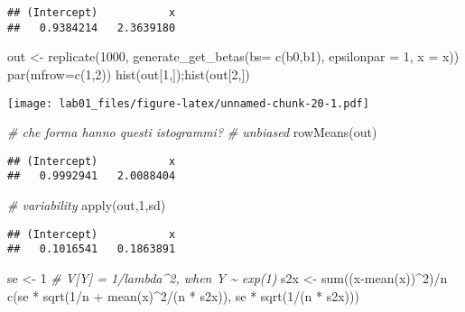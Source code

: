 \documentclass[
]{article}
\newenvironment{Shaded}{\begin{snugshade}}{\end{snugshade}}
\newcommand{\AttributeTok}[1]{\textcolor[rgb]{0.77,0.63,0.00}{#1}}
\newcommand{\CommentTok}[1]{\textcolor[rgb]{0.56,0.35,0.01}{\textit{#1}}}
\newcommand{\DecValTok}[1]{\textcolor[rgb]{0.00,0.00,0.81}{#1}}
\newcommand{\FunctionTok}[1]{\textcolor[rgb]{0.00,0.00,0.00}{#1}}
\newcommand{\NormalTok}[1]{#1}
\newcommand{\OtherTok}[1]{\textcolor[rgb]{0.56,0.35,0.01}{#1}}
\newcommand{\SpecialCharTok}[1]{\textcolor[rgb]{0.00,0.00,0.00}{#1}}
\begin{document}
\begin{verbatim}
## (Intercept)           x 
##   0.9384214   2.3639180
\end{verbatim}

\begin{Shaded}
\begin{Highlighting}[]
\NormalTok{out }\OtherTok{\textless{}{-}} \FunctionTok{replicate}\NormalTok{(}\DecValTok{1000}\NormalTok{, }\FunctionTok{generate\_get\_betas}\NormalTok{(}\AttributeTok{bs=} \FunctionTok{c}\NormalTok{(b0,b1), }\AttributeTok{epsilonpar =} \DecValTok{1}\NormalTok{, }\AttributeTok{x =}\NormalTok{ x))}
\FunctionTok{par}\NormalTok{(}\AttributeTok{mfrow=}\FunctionTok{c}\NormalTok{(}\DecValTok{1}\NormalTok{,}\DecValTok{2}\NormalTok{))}
\FunctionTok{hist}\NormalTok{(out[}\DecValTok{1}\NormalTok{,]);}\FunctionTok{hist}\NormalTok{(out[}\DecValTok{2}\NormalTok{,])}
\end{Highlighting}
\end{Shaded}

\texttt{[image: lab01\_files/figure-latex/unnamed-chunk-20-1.pdf]}

\begin{Shaded}
\begin{Highlighting}[]
\CommentTok{\# che forma hanno questi istogrammi? }
\CommentTok{\# unbiased }
\FunctionTok{rowMeans}\NormalTok{(out)}
\end{Highlighting}
\end{Shaded}

\begin{verbatim}
## (Intercept)           x 
##   0.9992941   2.0088404
\end{verbatim}

\begin{Shaded}
\begin{Highlighting}[]
\CommentTok{\# variability}
\FunctionTok{apply}\NormalTok{(out,}\DecValTok{1}\NormalTok{,sd)}
\end{Highlighting}
\end{Shaded}

\begin{verbatim}
## (Intercept)           x 
##   0.1016541   0.1863891
\end{verbatim}

\begin{Shaded}
\begin{Highlighting}[]
\NormalTok{se }\OtherTok{\textless{}{-}} \DecValTok{1} \CommentTok{\# V[Y] = 1/lambda\^{}2, when Y \textasciitilde{} exp(1)}
\NormalTok{s2x }\OtherTok{\textless{}{-}} \FunctionTok{sum}\NormalTok{((x}\SpecialCharTok{{-}}\FunctionTok{mean}\NormalTok{(x))}\SpecialCharTok{\^{}}\DecValTok{2}\NormalTok{)}\SpecialCharTok{/}\NormalTok{n}
\FunctionTok{c}\NormalTok{(se }\SpecialCharTok{*} \FunctionTok{sqrt}\NormalTok{(}\DecValTok{1}\SpecialCharTok{/}\NormalTok{n }\SpecialCharTok{+} \FunctionTok{mean}\NormalTok{(x)}\SpecialCharTok{\^{}}\DecValTok{2}\SpecialCharTok{/}\NormalTok{(n }\SpecialCharTok{*}\NormalTok{ s2x)), se }\SpecialCharTok{*} \FunctionTok{sqrt}\NormalTok{(}\DecValTok{1}\SpecialCharTok{/}\NormalTok{(n }\SpecialCharTok{*}\NormalTok{ s2x)))}
\end{Highlighting}
\end{Shaded}
\end{document}
